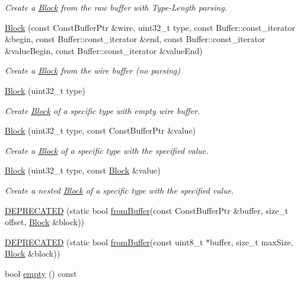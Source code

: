 \begin{DoxyCompactItemize}
\begin{DoxyCompactList}\small\item\em Create a \hyperlink{classndn_1_1Block}{Block} from the raw buffer with Type-\/\+Length parsing. \end{DoxyCompactList}\item 
\hyperlink{classndn_1_1Block_af9fd18155dd3cbb5dd2bd60be9def7ab}{Block} (const Const\+Buffer\+Ptr \&wire, uint32\+\_\+t type, const Buffer\+::const\+\_\+iterator \&begin, const Buffer\+::const\+\_\+iterator \&end, const Buffer\+::const\+\_\+iterator \&value\+Begin, const Buffer\+::const\+\_\+iterator \&value\+End)
\begin{DoxyCompactList}\small\item\em Create a \hyperlink{classndn_1_1Block}{Block} from the wire buffer (no parsing) \end{DoxyCompactList}\item 
\hyperlink{classndn_1_1Block_a97934c3f4c4f266ab90240a3f35099cb}{Block} (uint32\+\_\+t type)\hypertarget{classndn_1_1Block_a97934c3f4c4f266ab90240a3f35099cb}{}\label{classndn_1_1Block_a97934c3f4c4f266ab90240a3f35099cb}

\begin{DoxyCompactList}\small\item\em Create \hyperlink{classndn_1_1Block}{Block} of a specific type with empty wire buffer. \end{DoxyCompactList}\item 
\hyperlink{classndn_1_1Block_a55231dda72f6f5b1cef02595dbcc13f1}{Block} (uint32\+\_\+t type, const Const\+Buffer\+Ptr \&value)
\begin{DoxyCompactList}\small\item\em Create a \hyperlink{classndn_1_1Block}{Block} of a specific type with the specified value. \end{DoxyCompactList}\item 
\hyperlink{classndn_1_1Block_aac5b4d1d5b3385705f365ed4038596ea}{Block} (uint32\+\_\+t type, const \hyperlink{classndn_1_1Block}{Block} \&value)
\begin{DoxyCompactList}\small\item\em Create a nested \hyperlink{classndn_1_1Block}{Block} of a specific type with the specified value. \end{DoxyCompactList}\item 
\hyperlink{classndn_1_1Block_ae64ea93c21f9cb32d87826bacddb2803}{D\+E\+P\+R\+E\+C\+A\+T\+ED} (static bool \hyperlink{classndn_1_1Block_af540ada44f352d3cbc246a8f878488e1}{from\+Buffer}(const Const\+Buffer\+Ptr \&buffer, size\+\_\+t offset, \hyperlink{classndn_1_1Block}{Block} \&block))
\item 
\hyperlink{classndn_1_1Block_a9eeb693e2a40621a60eca01b0fcc3298}{D\+E\+P\+R\+E\+C\+A\+T\+ED} (static bool \hyperlink{classndn_1_1Block_af540ada44f352d3cbc246a8f878488e1}{from\+Buffer}(const uint8\+\_\+t $\ast$buffer, size\+\_\+t max\+Size, \hyperlink{classndn_1_1Block}{Block} \&block))
\item 
bool \hyperlink{classndn_1_1Block_a286543db272aaa16f2e5eca5468252f7}{empty} () const\hypertarget{classndn_1_1Block_a286543db272aaa16f2e5eca5468252f7}{}\label{classndn_1_1Block_a286543db272aaa16f2e5eca5468252f7}


\end{DoxyCompactItemize}

